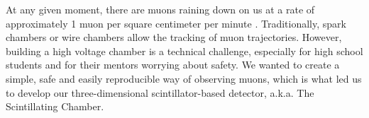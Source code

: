 At any given moment, there are muons raining down on us at a rate of approximately 1 muon per square centimeter per minute \cite{Spectrum of CRM,hyperphysics,atmospheric muon,pdg}. 
Traditionally, spark chambers or wire chambers allow the tracking of muon trajectories. However, building a high voltage chamber is a technical challenge, especially for high school students and for their mentors worrying about safety. We wanted to create a simple, safe and easily reproducible way of observing muons, which is what led us to develop our three-dimensional scintillator-based detector, a.k.a. The Scintillating Chamber.
